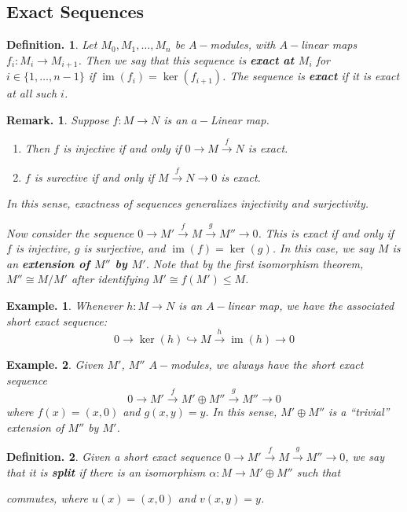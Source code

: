 \documentclass[11pt, a4paper]{memoir}
\newcommand{\fto}[1]{\ensuremath{\xrightarrow{\scriptstyle{#1}}}}
\newcommand{\hto}[0]{\ensuremath{\hookrightarrow}}
\theoremstyle{change}
\theoremstyle{plain}
\theoremstyle{nonumberplain}
\newtheorem{definition}{Definition.}
\newtheorem{example}{Example.}
\newtheorem{remark}{Remark.}
\DeclareMathOperator{\im}{im}
\numberwithin{equation}{section}
\begin{document}
\subsection{Exact Sequences}
\begin{definition}
    Let $M_0,M_1,\ldots,M_n$ be $A-$modules, with $A-$linear maps $f_i:M_i\to M_{i+1}$.
    Then we say that this sequence is \textbf{exact at $M_i$} for $i\in\{1,\ldots,n-1\}$ if $\im(f_i)=\ker(f_{i+1})$.
    The sequence is \textbf{exact} if it is exact at all such $i$.
\end{definition}
\begin{remark}
    Suppose $f:M\to N$ is an $a-$Linear map.
    \begin{enumerate}[nolistsep]
        \item Then $f$ is injective if and only if $0\to M\fto{f} N$ is exact.
        \item $f$ is surective if and only if $M\fto{f}N\to 0$ is exact.
    \end{enumerate}
    In this sense, exactness of sequences generalizes injectivity and surjectivity.

    Now consider the sequence $0\to M'\fto{f}M\fto{g} M''\to 0$.
    This is exact if and only if $f$ is injective, $g$ is surjective, and $\im(f)=\ker(g)$.
    In this case, we say $M$ is an \textbf{extension of $M''$ by $M'$}.
    Note that by the first isomorphism theorem, $M''\cong M/M'$ after identifying $M'\cong f(M')\leq M$.
\end{remark}
\begin{example}
    Whenever $h:M\to N$ is an $A-$linear map, we have the associated short exact sequence:
    \begin{equation*}
        0\to\ker(h)\hto M\fto{h}\im(h)\to 0
    \end{equation*}
\end{example}
\begin{example}
    Given $M'$, $M''$ $A-$modules, we always have the short exact sequence
    \begin{equation*}
        0\to M'\fto{f}M'\oplus M''\fto{g}M''\to 0
    \end{equation*}
    where $f(x)=(x,0)$ and $g(x,y)=y$.
    In this sense, $M'\oplus M''$ is a ``trivial'' extension of $M''$ by $M'$.
\end{example}
\begin{definition}
    Given a short exact sequence $0\to M'\fto{f} M\fto{g} M''\to 0$, we say that it is \textbf{split} if there is an isomorphism $\alpha:M\to M'\oplus M''$ such that
    \begin{center}
    \end{center}
    commutes, where $u(x)=(x,0)$ and $v(x,y)=y$.
\end{definition}
\end{document}
